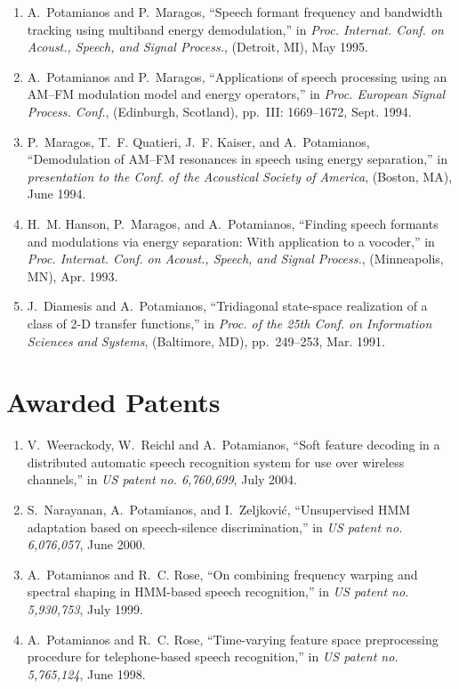 \begin{enumerate}
\item
A.~Potamianos and P.~Maragos, ``Speech formant frequency and bandwidth tracking
  using multiband energy demodulation,'' in {\em Proc. Internat. Conf. on
  Acoust., Speech, and Signal Process.}, (Detroit, MI), May 1995.

\item
A.~Potamianos and P.~Maragos, ``Applications of speech processing using an
  {AM}--{FM} modulation model and energy operators,'' in {\em Proc. European
  Signal Process. Conf.}, (Edinburgh, Scotland), pp.~III: 1669--1672, Sept.
  1994.

\item
P.~Maragos, T.~F. Quatieri, J.~F. Kaiser, and A.~Potamianos, ``Demodulation of
  {AM}--{FM} resonances in speech using energy separation,'' in {\em
  presentation to the Conf. of the Acoustical Society of America}, (Boston,
  MA), June 1994.

\item
H.~M. Hanson, P.~Maragos, and A.~Potamianos, ``Finding speech formants and
  modulations via energy separation: With application to a vocoder,'' in {\em
  Proc. Internat. Conf. on Acoust., Speech, and Signal Process.}, (Minneapolis,
  MN), Apr. 1993.

\item
J.~Diamesis and A.~Potamianos, ``Tridiagonal state-space realization of a class
  of 2-{D} transfer functions,'' in {\em Proc. of the 25th Conf. on Information
  Sciences and Systems}, (Baltimore, MD), pp.~249--253, Mar. 1991.

\end{enumerate}

\newpage

\section*{Awarded Patents}

\begin{enumerate}

\item
V.~Weerackody, W.~Reichl and A.~Potamianos, 
``Soft feature decoding in a distributed automatic speech recognition system for use over wireless channels,'' in {\em US patent no. 6,760,699}, July 2004.

\item
S.~Narayanan, A.~Potamianos, and I.~Zeljkovi\'c, ``Unsupervised {HMM}
  adaptation based on speech-silence discrimination,'' in {\em US patent no.
  6,076,057}, June 2000.

\item
A.~Potamianos and R.~C. Rose, ``On combining frequency warping and spectral
  shaping in {HMM}-based speech recognition,'' in {\em US patent no.
  5,930,753}, July 1999.

\item
A.~Potamianos and R.~C. Rose, ``Time-varying feature space preprocessing
  procedure for telephone-based speech recognition,'' in {\em US patent no.
  5,765,124}, June 1998.

\end{enumerate}

